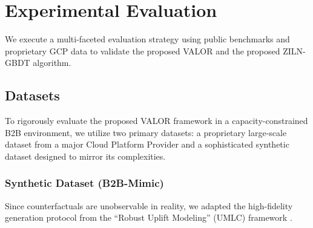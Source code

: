 \documentclass[runningheads]{llncs}
\begin{document}
    








\section{Experimental Evaluation}
We execute a multi-faceted evaluation strategy using public benchmarks and proprietary GCP data to validate the proposed VALOR and the proposed ZILN-GBDT algorithm. 

\subsection{Datasets}
To rigorously evaluate the proposed VALOR framework in a capacity-constrained B2B environment, we utilize two primary datasets: a proprietary large-scale dataset from a major Cloud Platform Provider and a sophisticated synthetic dataset designed to mirror its complexities.

\subsubsection{Synthetic Dataset (B2B-Mimic)}
Since counterfactuals are unobservable in reality, we adapted the high-fidelity generation protocol from the ``Robust Uplift Modeling'' (UMLC) framework \cite{sun2025robust}.
\end{document}

